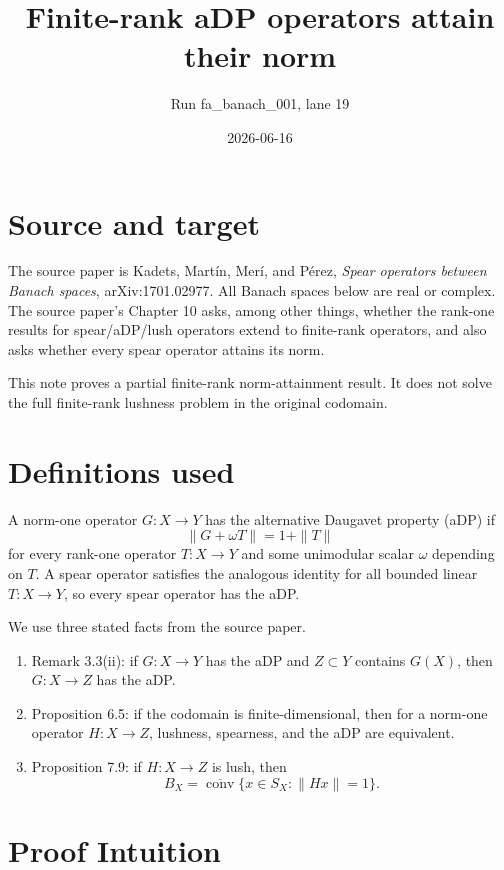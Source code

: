 \documentclass[11pt]{article}
\title{Finite-rank aDP operators attain their norm}
\author{Run fa\_banach\_001, lane 19}
\date{2026-06-16}
\newcommand{\conv}{\operatorname{conv}}
\begin{document}
\maketitle

\section*{Source and target}

The source paper is Kadets, Mart\'in, Mer\'i, and P\'erez,
\emph{Spear operators between Banach spaces}, arXiv:1701.02977.
All Banach spaces below are real or complex.  The source paper's
Chapter 10 asks, among other things, whether the rank-one results for
spear/aDP/lush operators extend to finite-rank operators, and also asks
whether every spear operator attains its norm.

This note proves a partial finite-rank norm-attainment result.  It does
not solve the full finite-rank lushness problem in the original codomain.

\section*{Definitions used}

A norm-one operator \(G:X\to Y\) has the alternative Daugavet property
(aDP) if
\[
  \|G+\omega T\|=1+\|T\|
\]
for every rank-one operator \(T:X\to Y\) and some unimodular scalar
\(\omega\) depending on \(T\).  A spear operator satisfies the analogous
identity for all bounded linear \(T:X\to Y\), so every spear operator
has the aDP.

We use three stated facts from the source paper.

\begin{enumerate}
\item Remark 3.3(ii): if \(G:X\to Y\) has the aDP and \(Z\subset Y\)
contains \(G(X)\), then \(G:X\to Z\) has the aDP.
\item Proposition 6.5: if the codomain is finite-dimensional, then for
a norm-one operator \(H:X\to Z\), lushness, spearness, and the aDP are
equivalent.
\item Proposition 7.9: if \(H:X\to Z\) is lush, then
\[
  B_X=\overline{\conv}\{x\in S_X:\|Hx\|=1\}.
\]
\end{enumerate}

\section*{Proof Intuition}
\end{document}
